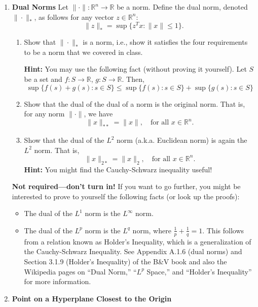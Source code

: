 \documentclass[11pt]{article}
\begin{document}
\begin{enumerate}

\item {\bf Dual Norms}
Let $\| \cdot \| : \mathbb{R}^n \rightarrow \mathbb{R}$ be a norm. Define the dual norm, denoted $\| \cdot \|_*$, as follows for any vector $z \in \mathbb{R}^n$:
$$\|z\|_* = \sup \{z^T x : \|x\| \leq 1 \}.$$

\begin{enumerate}
  \item Show that $\| \cdot \|_*$ is a norm, i.e., show it satisfies the four requirements to be a norm that we covered in class.

{\bf Hint:} You may use the following fact (without proving it yourself). Let $S$ be a set and $f : S \rightarrow \mathbb{R}$, $g : S \rightarrow \mathbb{R}$. Then,
$$\sup \{ f(s) + g(s) : s \in S\} \leq \sup \{f(s) : s \in S\} + \sup \{g(s) : s \in S\}$$

\item Show that the dual of the dual of a norm is the original norm. That is, for any norm $\| \cdot \|$, we have
$$\|x\|_{**} = \|x\|, \quad \text{for all $x \in \mathbb{R}^n$}.$$

\item Show that the dual of the $L^2$ norm (a.k.a. Euclidean norm) is again the $L^2$ norm. That is,
$$\|x\|_{2*} = \|x\|_2, \quad \text{for all $x \in \mathbb{R}^n$}.$$
{\bf Hint:} You might find the Cauchy-Schwarz inequality useful!

\end{enumerate}

{\bf Not required---don't turn in!} If you want to go further, you might
  be interested to prove to yourself the following facts (or look up the
  proofs):
  \begin{itemize}
  \item The dual of the $L^1$ norm is the $L^\infty$ norm.
  \item The dual of the $L^p$ norm is the $L^q$ norm, where
    $\frac{1}{p} + \frac{1}{q} = 1$. This follows from a relation known as
    Holder's Inequality, which is a generalization of the Cauchy-Schwarz
    Inequality.  See Appendix A.1.6 (dual norms) and Section 3.1.9 (Holder's
    Inequality) of the B\&V book and also the Wikipedia pages on ``Dual Norm,''
    ``$L^p$ Space,'' and ``Holder's Inequality'' for more information.
  \end{itemize}
  

\item {\bf Point on a Hyperplane Closest to the Origin}
  

\end{enumerate}
\end{document}
